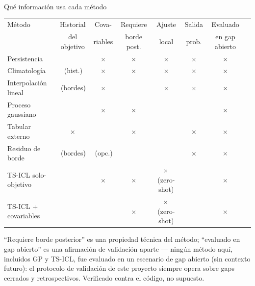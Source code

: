 \documentclass[aspectratio=169,11pt]{beamer}
\newcommand{\yes}{\textcolor{cgreen}{\textbf{\checkmark}}}
\newcommand{\weak}{\textcolor{camber}{\textbf{\raisebox{0.1ex}{$\sim$}}}}
\newcommand{\no}{\textcolor{cred}{\textbf{$\times$}}}
\begin{document}
\begin{frame}[t]{Qué información usa cada método}
  \vskip6pt
  \begin{center}\scriptsize
  \renewcommand{\arraystretch}{1.15}
  \setlength{\tabcolsep}{3.2pt}
  \begin{tabular}{@{}l c c c c c c c@{}}
    \toprule
    Método & Historial & Cova- & Requiere & Ajuste & Salida & Evaluado & \\
     & del objetivo & riables & borde post. & local & prob. & en gap abierto & \\
    \midrule
    Persistencia            & \yes & \no  & \no  & \no  & \no  & \no & \\
    Climatología             & \yes\,(hist.) & \no  & \no  & \no  & \no  & \no & \\
    Interpolación lineal     & \yes\,(bordes) & \no  & \yes & \no  & \no  & \no & \\
    Proceso gaussiano        & \yes & \no  & \no  & \yes & \yes & \no & \\
    Tabular externo          & \no  & \yes & \no  & \yes & \no  & \no & \\
    Residuo de borde         & \yes\,(bordes) & \weak\,(opc.) & \yes & \yes & \no  & \no & \\
    TS-ICL solo-objetivo     & \yes & \no  & \no  & \no\,(zero-shot) & \yes & \no & \\
    TS-ICL + covariables     & \yes & \yes & \no  & \no\,(zero-shot) & \yes & \no & \\
    \bottomrule
  \end{tabular}
  \end{center}
  \vskip0.12cm
  {\scriptsize\color{ink}``Requiere borde posterior'' es una propiedad técnica del
   método; ``evaluado en gap abierto'' es una afirmación de validación aparte ---
   ningún método aquí, incluidos GP y TS-ICL, fue evaluado en un escenario de gap
   abierto (sin contexto futuro): el protocolo de validación de este proyecto siempre
   opera sobre gaps cerrados y retrospectivos. Verificado contra el código, no supuesto.}
\end{frame}
\end{document}

